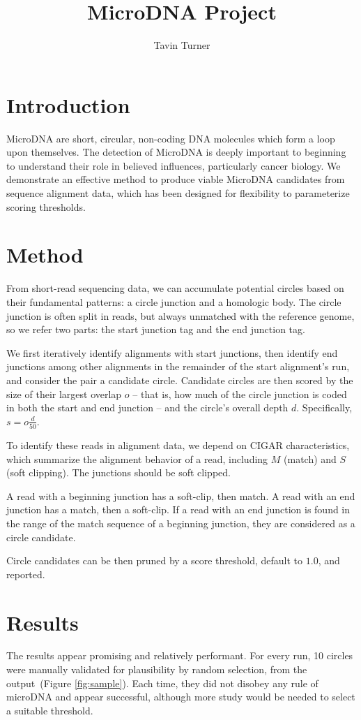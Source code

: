 \documentclass[11pt, letterpaper]{article}
\begin{document}
\title{MicroDNA Project}
\author{Tavin Turner}
\maketitle

\section{Introduction}
MicroDNA are short, circular, non-coding DNA molecules which form a loop upon themselves. The detection of MicroDNA is deeply important to beginning to understand their role in believed influences, particularly cancer biology. We demonstrate an effective method to produce viable MicroDNA candidates from sequence alignment data, which has been designed for flexibility to parameterize scoring thresholds.

\section{Method}
From short-read sequencing data, we can accumulate potential circles based on their fundamental patterns: a circle junction and a homologic body. The circle junction is often split in reads, but always unmatched with the reference genome, so we refer two parts: the start junction tag and the end junction tag.

We first iteratively identify alignments with start junctions, then identify end junctions among other alignments in the remainder of the start alignment's run, and consider the pair a candidate circle. Candidate circles are then scored by the size of their largest overlap $o$ – that is, how much of the circle junction is coded in both the start and end junction – and the circle's overall depth $d$. Specifically, $s=o\frac{d}{50}$.

To identify these reads in alignment data, we depend on CIGAR characteristics, which summarize the alignment behavior of a read, including $M$ (match) and $S$ (soft clipping). The junctions should be soft clipped.

A read with a beginning junction has a soft-clip, then match. A read with an end junction has a match, then a soft-clip. If a read with an end junction is found in the range of the match sequence of a beginning junction, they are considered as a circle candidate.

Circle candidates can be then pruned by a score threshold, default to $1.0$, and reported.

\section{Results}
The results appear promising and relatively performant. For every run, 10 circles were manually validated for plausibility by random selection, from the output~(Figure \ref{fig:sample}). Each time, they did not disobey any rule of microDNA and appear successful, although more study would be needed to select a suitable threshold.
\end{document}
